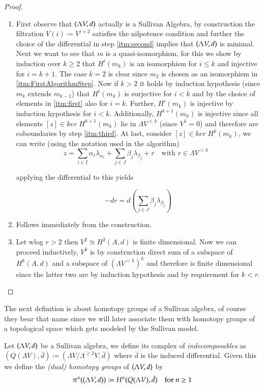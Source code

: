 \begin{proof}
\begin{enumerate}
 \item 

 First observe that $(\Lambda V,d)$ actually is a Sullivan Algebra, by construction the filtration $V(i) \coloneqq V^{i+2}$ satisfies
 the nilpotence condition and further the choice of the differential in step \ref{itm:second} implies that $(\Lambda V,d)$ is minimal.
 Next we want to see that $m$ is a quasi-isomorphism, for this we show by induction over $k \geq 2$ that
 $H^i(m_k)$ is an isomorphism for $i \leq k$ and injective for $ i = k +1$. The case $k = 2$ is clear since $m_2$ is chosen
 as an isomorphism in \ref{itm:FirstAlgorithmStep}. Now if $k > 2$ it holds by induction hypothesis (since $m_k$ extends
 $m_{k-1}$) that $H^i(m_k)$ is surjective for $i < k$ and by the choice of elements in \ref{itm:first} also for $i = k$.
 Further, $H^i(m_k)$ is injective by induction hypothesis for $i < k$. Additionally, $H^{k+1}(m_k)$ is injective since
 all elements $[z] \in ker \; H^{k+1}(m_k)$ lie in $\Lambda V^{<k}$ (since $V^1 = 0$) and therefore are
 coboundaries by step \ref{itm:third}. At last, consider $[z] \in ker \; H^k (m_k)$, we can write (using the notation used in
 the algorithm)
 $$z = \sum_{i \in I} \alpha_i \lambda_{\alpha_i} + \sum_{j \in J} \beta_j \lambda_{\beta_j} 
 + r \quad \text{with $r \in \Lambda V^{<k}$ }$$
 
 applying the differential to this yields 
 
 $$ -dr = d(\sum_{j \in J} \beta_j \lambda_{\beta_j} )$$

 \item Follows immediately from the construction.
 \item Let wlog $r > 2$ then $V^2 \cong H^2(A,d)$ is finite dimensional. Now we can proceed inductively, $V^k$ is by construction 
 direct sum of a subspace of $H^k(A,d)$ and a subspace of $(\Lambda V^{ <k })^k$ and therefore is finite dimensional since
 the latter two are by induction hypothesis and by requirement for $k<r$.
 \end{enumerate}
\end{proof}

The next definition is about homotopy groups of a Sullivan algebra, of course they bear that name since we will later
associate them with homotopy groups of a topological space which gets modeled by the Sullivan model.

\begin{Definition}
 Let $(\Lambda V,d)$ be a Sullivan algebra, we define its complex of \emph{indecomposables} as
 $(Q(\Lambda V),\bar{d}) \coloneqq (\Lambda V / \Lambda^{\geq 2} V , \bar{d})$ where $\bar{d}$ is the induced differential.
 Given this we define the \emph{(dual) homotopy groups} of $(\Lambda V,d)$ by 
 $$ \pi^n ( (\Lambda V,d)) \coloneqq H^n(Q(\Lambda V),\bar{d}) \quad \text{for $n \geq 1$}$$
\end{Definition}

